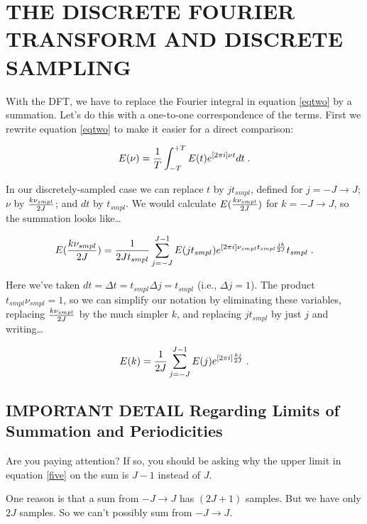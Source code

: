 \documentclass[11pt,preprint]{aastex}
\begin{document}
\section{THE DISCRETE FOURIER TRANSFORM AND DISCRETE SAMPLING}

\label{four}

	With the DFT, we have to replace the Fourier integral in
equation \ref{eqtwo} by a summation.  Let's do this with a one-to-one
correspondence of the terms. First we rewrite equation \ref{eqtwo} to
make it easier for a direct comparison:

\begin{equation} \label{eqtwoa}
E(\nu) = {1 \over T}
\int_{-T}^{+T} E(t) e^{[2 \pi i]\nu t}  dt \; .
\end{equation}

	In our discretely-sampled case we can replace $t$ by $j
t_{smpl}$, defined for $j = -J \rightarrow J$; $\nu$ by ${k\nu_{smpl}
\over 2J}$; and $dt$ by $t_{smpl}$.  We would calculate
$E({k\nu_{smpl}\over 2J})$ for $k = -J \rightarrow J$, so the summation
looks like\dots

\begin{equation} \label{eqfivea}
E({k\nu_{smpl} \over 2J}) = {1 \over 2Jt_{smpl}} \sum_{j=-J}^{J-1}  E(j
t_{smpl}) e^{[2 \pi i] \nu_{smpl}t_{smpl} {jk \over 2J}} t_{smpl} \; .
\end{equation}

\noindent Here we've taken $dt = \Delta t = t_{smpl} \Delta j =
t_{smpl}$ (i.e., $\Delta j=1$).  The product $t_{smpl}\nu_{smpl} = 1$,
so we can simplify our notation by eliminating these variables,
replacing ${k\nu_{smpl} \over 2J}$ by the much simpler $k$, and
replacing $j t_{smpl}$ by just $j$ and writing\dots

\begin{equation} \label{five}
E(k) = {1 \over 2J} \sum_{j=-J}^{J-1} E(j) e^{[2\pi i]
{kj \over 2J}} \; .  \end{equation}

\subsection{IMPORTANT DETAIL Regarding Limits of Summation and
Periodicities}

          Are you paying attention? If so, you should be asking why the
upper limit in equation \ref{five} on the sum is $J-1$ instead of $J$.  

	One reason is that a sum from $-J \rightarrow J$ has $(2J+1)$
samples.  But we have only $2J$ samples.  So we can't possibly sum from
$-J \rightarrow J$. 
\end{document}
